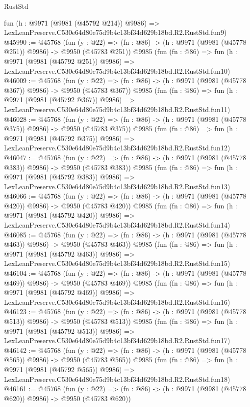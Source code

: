 \begin{lexlean}{RustStd}
\begin{coremodule}
    fun (h : @9971 (@9981 (@45792 @214)) @9986) =>
    LexLeanPreserve.C530e64d80e75d9b4c13bf34d629b18bd.R2.RustStd.fun9)
@45990 := @45768
    (fun (y : @22) => (fn : @86) -> (h : @9971 (@9981 (@45778 @251)) @9986) -> @9950 (@45783 @251))
    @9985
    (fun (fn : @86) =>
    fun (h : @9971 (@9981 (@45792 @251)) @9986) =>
    LexLeanPreserve.C530e64d80e75d9b4c13bf34d629b18bd.R2.RustStd.fun10)
@46009 := @45768
    (fun (y : @22) => (fn : @86) -> (h : @9971 (@9981 (@45778 @367)) @9986) -> @9950 (@45783 @367))
    @9985
    (fun (fn : @86) =>
    fun (h : @9971 (@9981 (@45792 @367)) @9986) =>
    LexLeanPreserve.C530e64d80e75d9b4c13bf34d629b18bd.R2.RustStd.fun11)
@46028 := @45768
    (fun (y : @22) => (fn : @86) -> (h : @9971 (@9981 (@45778 @375)) @9986) -> @9950 (@45783 @375))
    @9985
    (fun (fn : @86) =>
    fun (h : @9971 (@9981 (@45792 @375)) @9986) =>
    LexLeanPreserve.C530e64d80e75d9b4c13bf34d629b18bd.R2.RustStd.fun12)
@46047 := @45768
    (fun (y : @22) => (fn : @86) -> (h : @9971 (@9981 (@45778 @383)) @9986) -> @9950 (@45783 @383))
    @9985
    (fun (fn : @86) =>
    fun (h : @9971 (@9981 (@45792 @383)) @9986) =>
    LexLeanPreserve.C530e64d80e75d9b4c13bf34d629b18bd.R2.RustStd.fun13)
@46066 := @45768
    (fun (y : @22) => (fn : @86) -> (h : @9971 (@9981 (@45778 @420)) @9986) -> @9950 (@45783 @420))
    @9985
    (fun (fn : @86) =>
    fun (h : @9971 (@9981 (@45792 @420)) @9986) =>
    LexLeanPreserve.C530e64d80e75d9b4c13bf34d629b18bd.R2.RustStd.fun14)
@46085 := @45768
    (fun (y : @22) => (fn : @86) -> (h : @9971 (@9981 (@45778 @463)) @9986) -> @9950 (@45783 @463))
    @9985
    (fun (fn : @86) =>
    fun (h : @9971 (@9981 (@45792 @463)) @9986) =>
    LexLeanPreserve.C530e64d80e75d9b4c13bf34d629b18bd.R2.RustStd.fun15)
@46104 := @45768
    (fun (y : @22) => (fn : @86) -> (h : @9971 (@9981 (@45778 @469)) @9986) -> @9950 (@45783 @469))
    @9985
    (fun (fn : @86) =>
    fun (h : @9971 (@9981 (@45792 @469)) @9986) =>
    LexLeanPreserve.C530e64d80e75d9b4c13bf34d629b18bd.R2.RustStd.fun16)
@46123 := @45768
    (fun (y : @22) => (fn : @86) -> (h : @9971 (@9981 (@45778 @513)) @9986) -> @9950 (@45783 @513))
    @9985
    (fun (fn : @86) =>
    fun (h : @9971 (@9981 (@45792 @513)) @9986) =>
    LexLeanPreserve.C530e64d80e75d9b4c13bf34d629b18bd.R2.RustStd.fun17)
@46142 := @45768
    (fun (y : @22) => (fn : @86) -> (h : @9971 (@9981 (@45778 @565)) @9986) -> @9950 (@45783 @565))
    @9985
    (fun (fn : @86) =>
    fun (h : @9971 (@9981 (@45792 @565)) @9986) =>
    LexLeanPreserve.C530e64d80e75d9b4c13bf34d629b18bd.R2.RustStd.fun18)
@46161 := @45768
    (fun (y : @22) => (fn : @86) -> (h : @9971 (@9981 (@45778 @620)) @9986) -> @9950 (@45783 @620))

\end{coremodule}
\end{lexlean}
